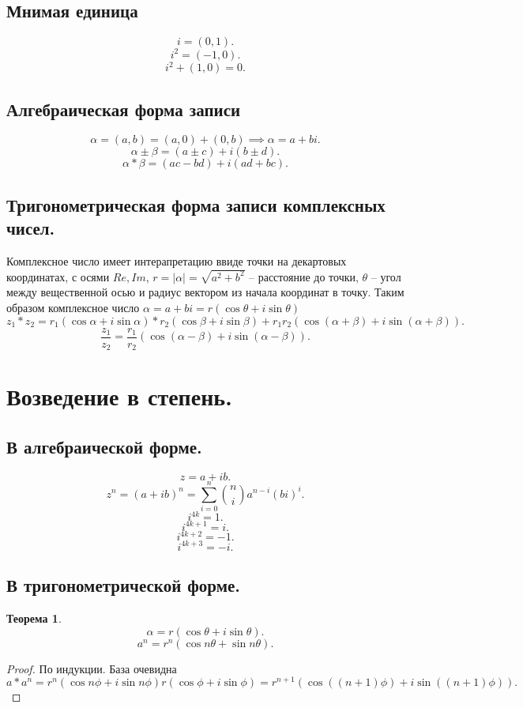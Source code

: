 \documentclass{scrartcl}
\newtheorem{theorem}{Теорема}
\begin{document}
    \subsection{Мнимая единица}
    \[
    i = (0,1)
    .\] 
    \[
    i^2 = (-1, 0)
    .\] 
    \[
    i^2 + (1, 0) = 0
    .\] 
    \subsection{Алгебраическая форма записи}
    \[
    \alpha = (a,b) = (a,0) + (0,b) \implies \alpha = a + bi
    .\] 
    \[
    \alpha  \pm \beta = (a \pm c) + i(b \pm d)
    .\] 
    \[
    \alpha * \beta = (ac - bd) + i(ad + bc)
    .\] 
    \subsection{Тригонометрическая форма записи комплексных чисел.}
    Комплексное число имеет интерапретацию ввиде точки на декартовых координатах, с осями $Re, Im$,  $r = |\alpha| = \sqrt{a^2 + b^2} $ -- расстояние до точки, $\theta$ -- угол между вещественной осью и радиус вектором из начала координат в точку.
    Таким образом комплексное число  $\alpha = a+bi = r(\cos{\theta} + i\sin{\theta})$
     \[
         z_1 * z_2 = r_1(\cos{\alpha} + i\sin{\alpha}) * r_2(\cos{\beta} + i\sin{\beta}) + r_1r_2 (\cos{( \alpha + \beta )} + i \sin{( \alpha + \beta )})
    .\] 
    \[
        \frac{z_1}{z_2} = \frac{r_1}{r_2} (\cos{( \alpha - \beta )} + i \sin{( \alpha - \beta )})
    .\]
    \section{Возведение в степень.}
    \subsection{В алгебраической форме.}
    \[
    z = a + ib
    .\] 
    \[
        z^{n} = (a + ib)^{n} = \sum_{i=0}^{n} \binom{n}{i} a^{n - i}(bi)^{i}
    .\] 
    \[
    i^{4k} = 1
    .\] 
    \[
    i^{4k + 1} = i
    .\] 
    \[
        i^{4k + 2} = -1
    .\] 
    \[
        i^{4k + 3} = -i
    .\] 
    \subsection{В тригонометрической форме.}
    \begin{theorem}
        \[
            \alpha = r (\cos{\theta} + i \sin{\theta})
        .\] 
        \[
            a^{n} = r^{n} (\cos{n\theta} + \sin{n\theta})
        .\] 
    \end{theorem}
    \begin{proof}
        По индукции. База очевидна
        \[
            a * a^{n} = r^{n} (\cos{n\phi} + i\sin{n\phi}) r (\cos{\phi} + i\sin{\phi}) = r^{n + 1} (\cos{((n + 1) \phi)} + i \sin{((n + 1) \phi)})
        .\] 
    \end{proof}
\end{document}
